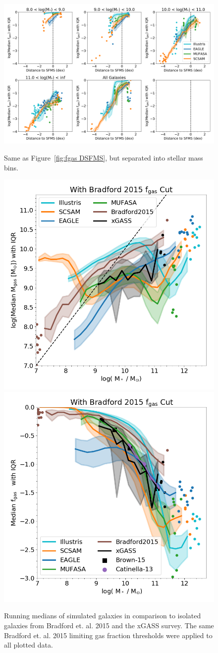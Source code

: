 \documentclass[fleqn,usenatbib]{mnras}
\begin{document}
\begin{figure}
\includegraphics[width = 0.99\linewidth]{fgas_DSFMS_panel_plot_IQR_logged.png}\\
\caption{Same as Figure~\ref{fig:fgas DSFMS}, but separated into stellar mass bins.}
\label{fig:fgas DSFMS panel}
\end{figure}

\begin{figure}
\includegraphics[width = 0.49\linewidth]{MHI_Mstar_binned_IQR_bradford_fgas_cut}
\includegraphics[width=0.49\linewidth]{fgas_mstar_binned_IQR_logged_bradford_fgas_cut.png}
\caption{Running medians of simulated galaxies in comparison to isolated galaxies from Bradford et. al. 2015 and the xGASS survey. The same Bradford et. al. 2015 limiting gas fraction thresholds were applied to all plotted data.}
\label{fig:fgas DSFMS panel}
\end{figure}
\end{document}
